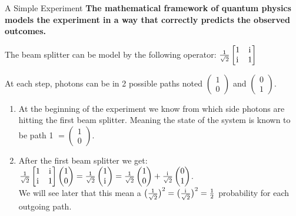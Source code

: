 \documentclass[svgnames,smaller,aspectratio=169]{beamer}
\begin{document}
\begin{frame}[fragile]{A Simple Experiment \cite{interfer}}
  \textbf{The mathematical framework of quantum physics models the experiment in a way that correctly predicts the
    observed outcomes.}

  The beam splitter can be model by the following operator:
  $\frac{1}{\sqrt{2}}\begin{bmatrix} 1 & \mathrm{i}\mkern1mu \\ \mathrm{i}\mkern1mu & 1 \end{bmatrix}$
  
  At each step, photons can be in 2 possible paths noted $\begin{pmatrix} 1 \\ 0 \end{pmatrix}$ and $\begin{pmatrix} 0 \\ 1 \end{pmatrix}$.

  \begin{enumerate}
  \item At the beginning of the experiment we know from which side photons are hitting the first beam splitter.
    Meaning the state of the system is known to be path 1 $= \begin{pmatrix} 1 \\ 0 \end{pmatrix}$.

  \item After the first beam splitter we get:
    $\frac{1}{\sqrt{2}}\begin{bmatrix} 1 & \mathrm{i}\mkern1mu \\ \mathrm{i}\mkern1mu & 1 \end{bmatrix} \begin{pmatrix} 1 \\ 0 \end{pmatrix} =
    \frac{1}{\sqrt{2}} \begin{pmatrix} 1 \\ \mathrm{i}\mkern1mu \end{pmatrix} =
    \frac{1}{\sqrt{2}} \begin{pmatrix} 1 \\ 0 \end{pmatrix} + \frac{\mathrm{i}\mkern1mu}{\sqrt{2}}\begin{pmatrix} 0 \\ 1 \end{pmatrix}$. \\
    We will see later that this mean a $\bigl(\frac{1}{\sqrt{2}}\bigr)^2= \bigl(\frac{\mathrm{i}\mkern1mu}{\sqrt{2}}\bigr)^2=\frac{1}{2}$ probability for each outgoing path.


\end{enumerate}
\end{frame}
\end{document}
